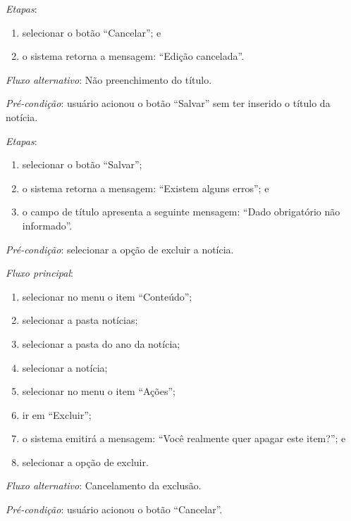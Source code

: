 \noindent \textit{Etapas}:

\begin{enumerate}
    \item selecionar o botão ``Cancelar''; e
    \item o sistema retorna a mensagem: ``Edição cancelada''.
\end{enumerate}

\noindent \textit{Fluxo alternativo}: Não preenchimento do título.

\noindent \textit{Pré-condição}: usuário acionou o botão ``Salvar'' sem ter inserido o título da notícia.

\noindent \textit{Etapas}:

\begin{enumerate}
    \item selecionar o botão ``Salvar'';
    \item o sistema retorna a mensagem: ``Existem alguns erros''; e
    \item o campo de título apresenta a seguinte mensagem: ``Dado obrigatório não informado''.
\end{enumerate}




\vspace{0.7cm}

\noindent \textit{Pré-condição}: selecionar a opção de excluir a notícia.

\noindent \textit{Fluxo principal}:

\begin{enumerate}
    \item selecionar no menu o item ``Conteúdo'';
    \item selecionar a pasta notícias;
    \item selecionar a pasta do ano da notícia;
    \item selecionar a notícia;
    \item selecionar no menu o item ``Ações'';
    \item ir em ``Excluir'';
    \item o sistema emitirá a mensagem: ``Você realmente quer apagar este item?''; e
    \item selecionar a opção de excluir.
\end{enumerate}

\noindent \textit{Fluxo alternativo}: Cancelamento da exclusão.

\noindent \textit{Pré-condição}: usuário acionou o botão ``Cancelar''.

